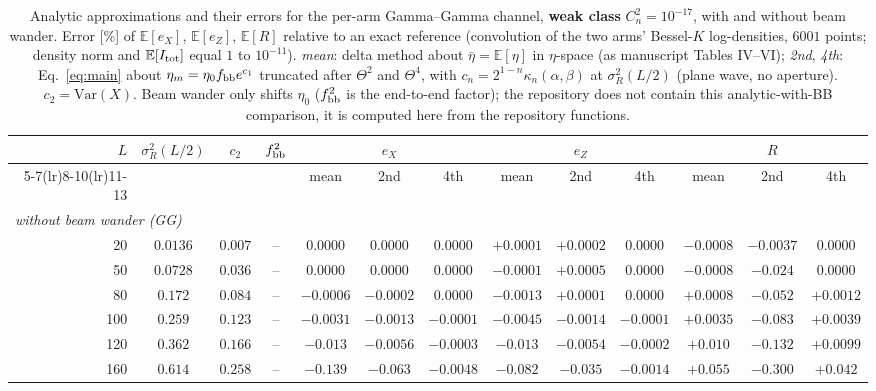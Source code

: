 \documentclass[11pt,a4paper]{article}
\theoremstyle{plain}
\theoremstyle{remark}
\begin{document}
\begin{table}[htbp]
\centering\scriptsize
\caption{Analytic approximations and their errors for the per-arm Gamma--Gamma channel, \textbf{weak class} $C_n^2=10^{-17}$, with and without beam wander. Error [\%] of $\mathbb E[e_X]$, $\mathbb E[e_Z]$, $\mathbb E[R]$ relative to an exact reference (convolution of the two arms' Bessel-$K$ log-densities, $6001$ points; density norm and $\mathbb E[I_{\rm tot}]$ equal $1$ to $10^{-11}$). \emph{mean}: delta method about $\bar\eta=\mathbb E[\eta]$ in $\eta$-space (as manuscript Tables IV--VI); \emph{2nd}, \emph{4th}: Eq.~\eqref{eq:main} about $\eta_m=\eta_0f_{\rm bb}e^{c_1}$ truncated after $\Theta^2$ and $\Theta^4$, with $c_n=2^{1-n}\kappa_n(\alpha,\beta)$ at $\sigma_R^2(L/2)$ (plane wave, no aperture). $c_2=\mathrm{Var}(X)$. Beam wander only shifts $\eta_0$ ($f_{\rm bb}^2$ is the end-to-end factor); the repository does not contain this analytic-with-BB comparison, it is computed here from the repository functions.}
\label{tab:perarm-weak}
\begin{tabular}{rcccccccccccc}
\toprule
$L$ & $\sigma_R^2(L/2)$ & $c_2$ & $f_{\rm bb}^2$ & \multicolumn{3}{c}{$e_X$} & \multicolumn{3}{c}{$e_Z$} & \multicolumn{3}{c}{$R$}\\
\cmidrule(lr){5-7}\cmidrule(lr){8-10}\cmidrule(lr){11-13}
 & & & & mean & 2nd & 4th & mean & 2nd & 4th & mean & 2nd & 4th\\
\midrule
\multicolumn{13}{l}{\emph{without beam wander (GG)}} \\
20 & $0.0136$ & $0.007$ & -- & $0.0000$ & $0.0000$ & $0.0000$ & $+0.0001$ & $+0.0002$ & $0.0000$ & $-0.0008$ & $-0.0037$ & $0.0000$ \\
50 & $0.0728$ & $0.036$ & -- & $0.0000$ & $0.0000$ & $0.0000$ & $-0.0001$ & $+0.0005$ & $0.0000$ & $-0.0008$ & $-0.024$ & $0.0000$ \\
80 & $0.172$ & $0.084$ & -- & $-0.0006$ & $-0.0002$ & $0.0000$ & $-0.0013$ & $+0.0001$ & $0.0000$ & $+0.0008$ & $-0.052$ & $+0.0012$ \\
100 & $0.259$ & $0.123$ & -- & $-0.0031$ & $-0.0013$ & $-0.0001$ & $-0.0045$ & $-0.0014$ & $-0.0001$ & $+0.0035$ & $-0.083$ & $+0.0039$ \\
120 & $0.362$ & $0.166$ & -- & $-0.013$ & $-0.0056$ & $-0.0003$ & $-0.013$ & $-0.0054$ & $-0.0002$ & $+0.010$ & $-0.132$ & $+0.0099$ \\
160 & $0.614$ & $0.258$ & -- & $-0.139$ & $-0.063$ & $-0.0048$ & $-0.082$ & $-0.035$ & $-0.0014$ & $+0.055$ & $-0.300$ & $+0.042$ \\

\end{tabular}
\end{table}
\end{document}

